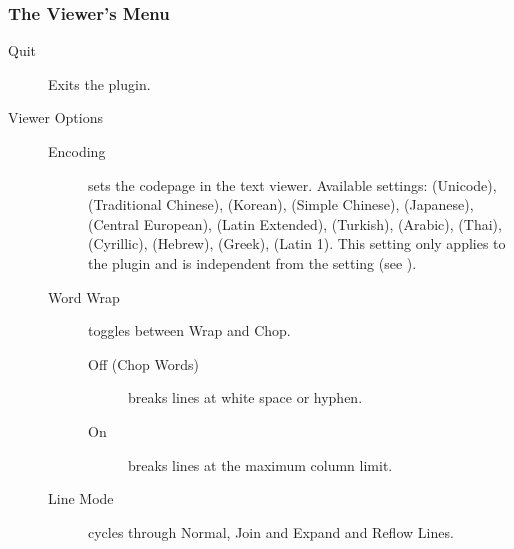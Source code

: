 \subsubsection{The Viewer's Menu}

\begin{description}
\item[Quit] Exits the plugin.
\item[Viewer Options]
    \begin{description}
    \item[Encoding]
    sets the codepage in the text viewer.
    Available settings:
     (Unicode),
     (Traditional Chinese),
     (Korean),
     (Simple Chinese),
     (Japanese),
     (Central European),
     (Latin Extended),
     (Turkish),
     (Arabic),
     (Thai),
     (Cyrillic),
     (Hebrew),
     (Greek),
     (Latin 1).
    This setting only applies to the plugin and is independent from the
     setting (see ).
    \item[Word Wrap] toggles between Wrap and Chop.
        \begin{description}
            \item[Off (Chop Words)] breaks lines at white space or hyphen.
            \item[On] breaks lines at the maximum column limit.
        \end{description}
    \item[Line Mode] cycles through Normal, Join and Expand and Reflow Lines.
\end{description}
\end{description}
